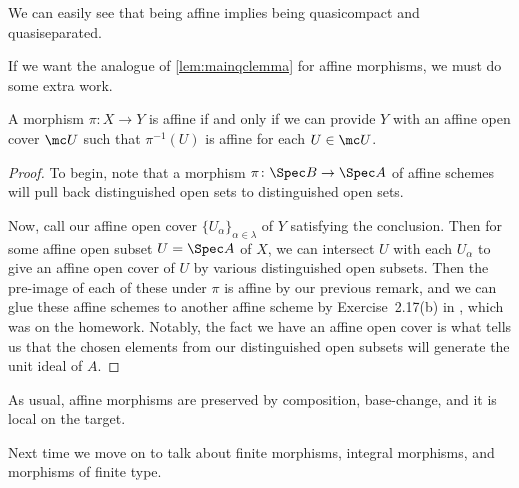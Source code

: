 \documentclass[../notes.tex]{subfiles}
\begin{document}
\begin{remark}
	We can easily see that being affine implies being quasicompact and quasiseparated.
\end{remark}
If we want the analogue of \autoref{lem:mainqclemma} for affine morphisms, we must do some extra work.
\begin{lemma}
	A morphism $\pi\colon X\to Y$ is affine if and only if we can provide $Y$ with an affine open cover $\mc U$ such that $\pi^{-1}(U)$ is affine for each $U\in\mc U$.
\end{lemma}
\begin{proof}
	To begin, note that a morphism $\pi\colon\Spec B\to\Spec A$ of affine schemes will pull back distinguished open sets to distinguished open sets.

	Now, call our affine open cover $\{U_\alpha\}_{\alpha\in\lambda}$ of $Y$ satisfying the conclusion. Then for some affine open subset $U=\Spec A$ of $X$, we can intersect $U$ with each $U_\alpha$ to give an affine open cover of $U$ by various distinguished open subsets. Then the pre-image of each of these under $\pi$ is affine by our previous remark, and we can glue these affine schemes to another affine scheme by Exercise~2.17(b) in \cite{hartshorne}, which was on the homework. Notably, the fact we have an affine open cover is what tells us that the chosen elements from our distinguished open subsets will generate the unit ideal of $A$.
\end{proof}
\begin{remark}
	As usual, affine morphisms are preserved by composition, base-change, and it is local on the target.
\end{remark}
Next time we move on to talk about finite morphisms, integral morphisms, and morphisms of finite type.
\end{document}
